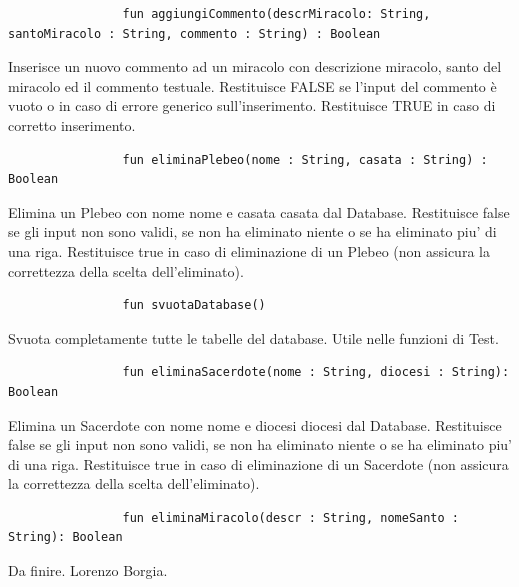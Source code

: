 \documentclass[a4paper]{report}
\begin{document}
                \vspace*{1cm}

                \begin{verbatim}
                fun aggiungiCommento(descrMiracolo: String, santoMiracolo : String, commento : String) : Boolean
                \end{verbatim}
                Inserisce un nuovo commento ad un miracolo con descrizione miracolo, santo del miracolo ed il commento testuale.
                Restituisce FALSE se l'input del commento è vuoto o in caso di errore generico sull'inserimento.
                Restituisce TRUE in caso di corretto inserimento.

                \vspace*{1cm}
                
                \begin{verbatim}
                fun eliminaPlebeo(nome : String, casata : String) : Boolean
                \end{verbatim}
                Elimina un Plebeo con nome nome e casata casata dal Database.
                Restituisce false se gli input non sono validi, se non ha eliminato niente o se ha eliminato piu' di una riga.
                Restituisce true in caso di eliminazione di un Plebeo (non assicura la correttezza della scelta dell'eliminato).

                \vspace*{1cm}
                
                \begin{verbatim}
                fun svuotaDatabase()
                \end{verbatim}
                Svuota completamente tutte le tabelle del database. Utile nelle funzioni di Test.

                \vspace*{1cm}
                
                \begin{verbatim}
                fun eliminaSacerdote(nome : String, diocesi : String): Boolean
                \end{verbatim}
                Elimina un Sacerdote con nome nome e diocesi diocesi dal Database.
                Restituisce false se gli input non sono validi, se non ha eliminato niente o se ha eliminato piu' di una riga.
                Restituisce true in caso di eliminazione di un Sacerdote (non assicura la correttezza della scelta dell'eliminato).

                \vspace*{1cm}
                
                \begin{verbatim}
                fun eliminaMiracolo(descr : String, nomeSanto : String): Boolean
                \end{verbatim}
                Da finire.
                Lorenzo Borgia.

                \vspace*{1cm}
\end{document}
